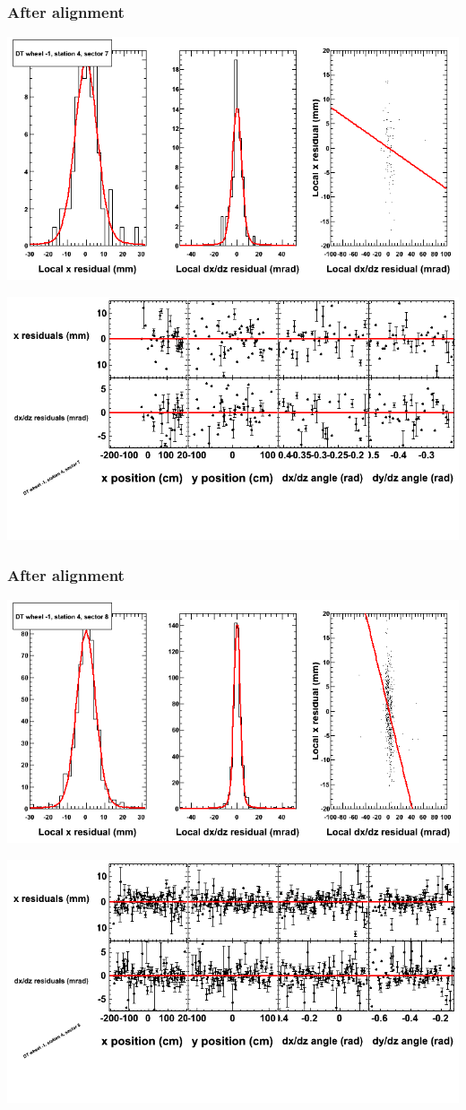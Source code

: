 \documentclass[compress]{beamer}
\begin{document}
\begin{frame}
\frametitle{After alignment}
\includegraphics[width=0.7\linewidth]{NOV4_fitfunctions/MBwhBst4sec07_bellcurves.png}

\includegraphics[width=0.7\linewidth]{NOV4_fitfunctions/MBwhBst4sec07_polynomials.png}
\end{frame}

\begin{frame}
\frametitle{After alignment}
\includegraphics[width=0.7\linewidth]{NOV4_fitfunctions/MBwhBst4sec08_bellcurves.png}

\includegraphics[width=0.7\linewidth]{NOV4_fitfunctions/MBwhBst4sec08_polynomials.png}
\end{frame}
\end{document}
